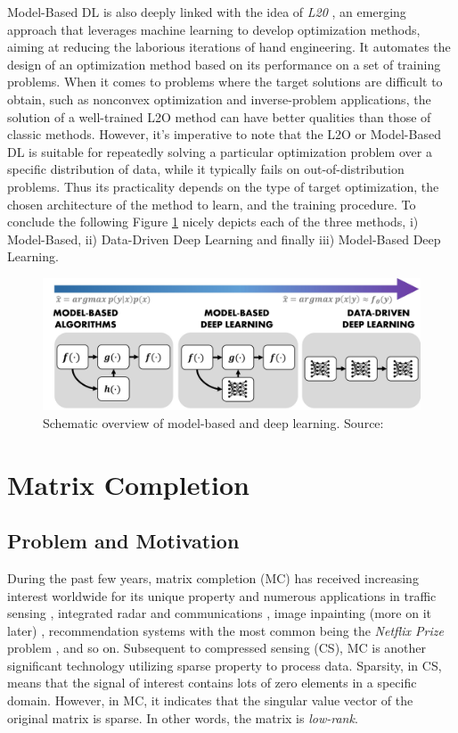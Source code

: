 Model-Based DL is also deeply linked with the idea of \textit{L20} \cite{chen2022learning}, an emerging approach that leverages machine learning to develop optimization methods, aiming at reducing the laborious iterations of hand engineering. It automates the design of an optimization method based on its performance on a set of training problems. When it comes to problems where the target solutions are difficult to obtain, such as nonconvex optimization and inverse-problem applications, the solution of a well-trained L2O method can have better qualities than those of classic methods. However, it's imperative to note that the L2O or Model-Based DL is suitable for repeatedly solving a particular optimization problem over a specific distribution of data, while it typically fails on out-of-distribution problems. Thus its practicality depends on the type of target optimization, the chosen architecture of the method to learn, and the training procedure. To conclude the following Figure \ref{fig: overview} nicely depicts each of the three methods, i) Model-Based, ii) Data-Driven Deep Learning and finally iii) Model-Based Deep Learning. 

\begin{figure}[htbp]
  \centering
  \includegraphics[width=\textwidth]{Figures/overview.jpg}
  \caption{Schematic overview of model-based and deep learning. Source: \cite{LUIJTEN2023677}}
  \label{fig: overview}
\end{figure}


\section{Matrix Completion}

\subsection{Problem and Motivation}

During the past few years, matrix completion (MC) has received increasing interest worldwide for its unique property and numerous applications in traffic sensing \cite{traffic_sensing}, integrated radar and communications \cite{radar_communications}, image inpainting (more on it later) \cite{image_inpainting}, recommendation systems with the most common being the \textit{Netflix Prize} problem \cite{jackson2017netflix}, and so on. Subsequent to compressed sensing (CS), MC is another significant technology utilizing sparse property to process data. Sparsity, in CS, means that the signal of interest contains lots of zero elements in a specific domain. However, in MC, it indicates that the singular value vector of the original matrix is sparse. In other words, the matrix is \textit{low-rank}.

